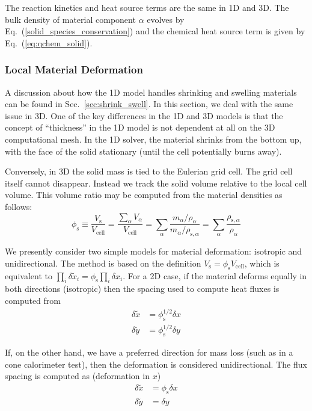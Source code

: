 The reaction kinetics and heat source terms are the same in 1D and 3D.  The bulk density of material component $\alpha$ evolves by Eq.~(\ref{solid_species_conservation}) and the chemical heat source term is given by Eq.~(\ref{eq:qchem_solid}).

\subsubsection*{Local Material Deformation}
\label{sec:locmatdef}

A discussion about how the 1D model handles shrinking and swelling materials can be found in Sec.~\ref{sec:shrink_swell}.  In this section, we deal with the same issue in 3D.  One of the key differences in the 1D and 3D models is that the concept of ``thickness'' in the 1D model is not dependent at all on the 3D computational mesh.  In the 1D solver, the material shrinks from the bottom up, with the face of the solid stationary (until the cell potentially burns away).

Conversely, in 3D the solid mass is tied to the Eulerian grid cell.  The grid cell itself cannot disappear.  Instead we track the solid volume relative to the local cell volume.  This volume ratio may be computed from the material densities as follows:
\begin{equation}
\label{eq:volratio}
\phi_{\mathrm{s}} \equiv \frac{V_{\mathrm{s}}}{V_{\mathrm{cell}}} = \frac{\sum_\alpha V_\alpha}{V_{\mathrm{cell}}} = \sum_\alpha \frac{m_\alpha/\rho_\alpha}{m_\alpha/\rho_{\mathrm{s},\alpha}} = \sum_\alpha \frac{\rho_{\mathrm{s},\alpha}}{\rho_\alpha}
\end{equation}

We presently consider two simple models for material deformation: isotropic and unidirectional.  The method is based on the definition $V_{\mathrm{s}}= \phi_{\mathrm{s}} V_{\mathrm{cell}}$, which is equivalent to $\prod_i \delta \tilde{x}_i = \phi_{\mathrm{s}} \prod_i \delta x_i$. For a 2D case, if the material deforms equally in both directions (isotropic) then the spacing used to compute heat fluxes is computed from
\begin{align}
\label{eq:dxdefiso}
\delta \tilde{x} &= \phi_{\mathrm{s}}^{1/2} \delta x \nonumber\\
\delta \tilde{y} &= \phi_{\mathrm{s}}^{1/2} \delta y
\end{align}

If, on the other hand, we have a preferred direction for mass loss (such as in a cone calorimeter test), then the deformation is considered unidirectional.  The flux spacing is computed as (deformation in $x$)
\begin{align}
\label{eq:dxdefuni}
\delta \tilde{x} &= \phi_{\mathrm{s}} \delta x \nonumber\\
\delta \tilde{y} &= \delta y
\end{align}

